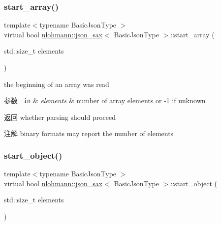 \subsubsection{\texorpdfstring{start\_array()}{start\_array()}}
{\footnotesize\ttfamily template$<$typename Basic\+Json\+Type $>$ \\
virtual bool \mbox{\hyperlink{structnlohmann_1_1json__sax}{nlohmann\+::json\+\_\+sax}}$<$ Basic\+Json\+Type $>$\+::start\+\_\+array (\begin{DoxyParamCaption}\item[{std\+::size\+\_\+t}]{elements }\end{DoxyParamCaption})\hspace{0.3cm}{\ttfamily [pure virtual]}}



the beginning of an array was read 


\begin{DoxyParams}[1]{参数}
\mbox{\texttt{ in}}  & {\em elements} & number of array elements or -\/1 if unknown \\
\hline
\end{DoxyParams}
\begin{DoxyReturn}{返回}
whether parsing should proceed 
\end{DoxyReturn}
\begin{DoxyNote}{注解}
binary formats may report the number of elements 
\end{DoxyNote}
\mbox{\label{structnlohmann_1_1json__sax_a0671528b0debb5a348169d61f0382a0f}} 
\subsubsection{\texorpdfstring{start\_object()}{start\_object()}}
{\footnotesize\ttfamily template$<$typename Basic\+Json\+Type $>$ \\
virtual bool \mbox{\hyperlink{structnlohmann_1_1json__sax}{nlohmann\+::json\+\_\+sax}}$<$ Basic\+Json\+Type $>$\+::start\+\_\+object (\begin{DoxyParamCaption}\item[{std\+::size\+\_\+t}]{elements }\end{DoxyParamCaption})\hspace{0.3cm}{\ttfamily [pure virtual]}}



